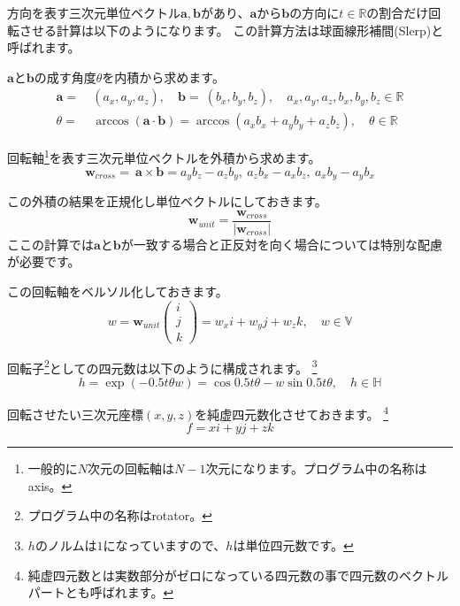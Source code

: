 \documentclass[a4paper,12pt,notitlepage]{jsreport}
\begin{document}
方向を表す三次元単位ベクトル$\bm{a},\bm{b}$があり、$\bm{a}$から$\bm{b}$の方向に$t\in\mathbb{R}$の割合だけ回転させる計算は以下のようになります。
この計算方法は球面線形補間(Slerp)と呼ばれます。

$\bm{a}$と$\bm{b}$の成す角度$\theta$を内積から求めます。
\begin{equation}
  \begin{split}
    \bm{a}=~&(a_x,a_y,a_z),\quad \bm{b}=~(b_x,b_y,b_z),\quad a_x,a_y,a_z,b_x,b_y,b_z\in\mathbb{R}\\
    \theta=~&\arccos(\bm{a}\cdot\bm{b})=\arccos(a_xb_x+a_yb_y+a_zb_z),\quad \theta\in\mathbb{R}
  \end{split}
\end{equation}

回転軸\footnote{一般的に$N$次元の回転軸は$N-1$次元になります。プログラム中の名称はaxis。}を表す三次元単位ベクトルを外積から求めます。
\begin{equation}
  \bm{w}_{cross}=~\bm{a}\times\bm{b}=a_yb_z-a_zb_y,~a_zb_x-a_xb_z,~a_xb_y-a_yb_x
\end{equation}

この外積の結果を正規化し単位ベクトルにしておきます。
\begin{equation}
  \bm{w}_{unit}=\frac{\bm{w}_{cross}}{|\bm{w}_{cross}|}
\end{equation}
ここの計算では$\bm{a}$と$\bm{b}$が一致する場合と正反対を向く場合については特別な配慮が必要です。

この回転軸をベルソル化しておきます。
\begin{equation}
  w=\bm{w}_{unit}\begin{pmatrix}i\\j\\k\end{pmatrix}=w_xi+w_yj+w_zk,\quad w\in\mathbb{V}
\end{equation}

回転子\footnote{プログラム中の名称はrotator。}としての四元数は以下のように構成されます。
\footnote{$h$のノルムは$1$になっていますので、$h$は単位四元数です。}
\begin{equation}
  h=\exp(-0.5t\theta w)=\cos 0.5t\theta-w\sin 0.5t\theta,\quad h\in\mathbb{H}
\end{equation}

回転させたい三次元座標$(x,y,z)$を純虚四元数化させておきます。
\footnote{純虚四元数とは実数部分がゼロになっている四元数の事で四元数のベクトルパートとも呼ばれます。}
\begin{equation}
  f=xi+yj+zk
\end{equation}
\end{document}
